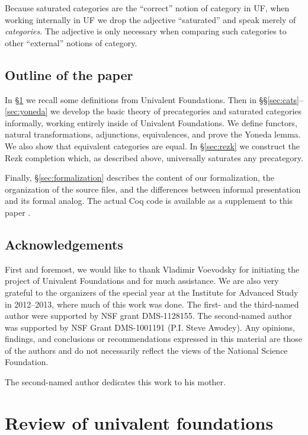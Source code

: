 \documentclass{amsart}
\theoremstyle{definition}
\theoremstyle{remark}
\numberwithin{equation}{section}
\begin{document}
\begin{rmk}
  Because saturated categories are the ``correct'' notion of category in UF, when working internally in UF we drop the adjective ``saturated'' and speak merely of \emph{categories}.
  The adjective is only necessary when comparing such categories to other ``external'' notions of category.
\end{rmk}

\subsection*{Outline of the paper}

In \S\ref{sec:background} we recall some definitions from Univalent Foundations.
Then in \S\S\ref{sec:cats}--\ref{sec:yoneda} we develop the basic theory of precategories and saturated categories informally, working entirely inside of Univalent Foundations.
We define functors, natural transformations, adjunctions, equivalences, and prove the Yoneda lemma.
We also show that equivalent categories are equal.
In \S\ref{sec:rezk} we construct the Rezk completion which, as described above, universally saturates any precategory.

Finally, \S\ref{sec:formalization} describes the content of our formalization, the organization of the source files, and the differences between informal presentation and its formal analog.
The actual \textsf{Coq} code is available as a supplement to this paper \cite{rezk_coq}.




\subsection*{Acknowledgements}
First and foremost, we would like to thank Vladimir Voevodsky for initiating the project of Univalent Foundations and for much assistance.
We are also very grateful to the organizers of the special year at the Institute for Advanced Study in 2012--2013, where much of this work was done.
The first- and the third-named author were supported by NSF grant DMS-1128155.
The second-named author was supported by NSF Grant DMS-1001191 (P.I. Steve Awodey).
Any opinions, findings, and conclusions or recommendations expressed in this material are those of the authors and do not necessarily reflect the views of the National Science Foundation.

The second-named author dedicates this work to his mother.

\section{Review of univalent foundations}
\label{sec:background}
\end{document}
